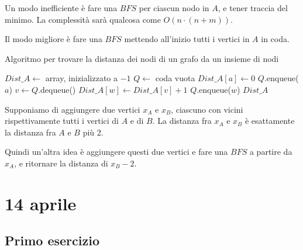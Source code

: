 Un modo inefficiente \`e fare una $BFS$ per ciascun nodo in $A$, e tener traccia del minimo. La complessit\`a sar\`a qualcosa come $O(n \cdot (n+m))$.

Il modo migliore \`e fare una $BFS$ mettendo all'inizio tutti i vertici in $A$ in coda.

\begin{algorithm}
\caption{Algoritmo per trovare la distanza dei nodi di un grafo da un insieme di nodi}
\begin{algorithmic}[1]
    \State $Dist\_A \gets$ array, inizializzato a $-1$
    \State $Q \gets$ coda vuota
        \State $Dist\_A[a] \gets 0$
        \State $Q$.enqueue($a$)
    \EndFor
        \State $v \gets Q$.dequeue()
                \State $Dist\_A[w] \gets Dist\_A[v] + 1$
                \State $Q$.enqueue($w$)
            \EndIf
        \EndFor
    \EndWhile
    \State \Return $Dist\_A$
\EndFunction
\end{algorithmic}
\end{algorithm}

Supponiamo di aggiungere due vertici $x_A$ e $x_B$, ciascuno con vicini rispettivamente tutti i vertici di $A$ e di $B$. La distanza fra $x_A$ e $x_B$ \`e esattamente la distanza fra $A$ e $B$ pi\`u 2.

Quindi un'altra idea \`e aggiungere questi due vertici e fare una $BFS$ a partire da $x_A$, e ritornare la distanza di $x_B - 2$.

\clearpage

\section{14 aprile}

\subsection{Primo esercizio}


